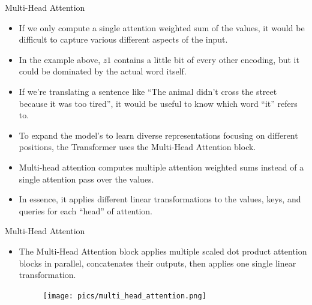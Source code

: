 \documentclass[handout]{beamer}
\begin{document}
\begin{frame}{Multi-Head Attention}
\begin{scriptsize}
\begin{itemize}

\item If we only compute a single attention weighted sum of the values, it would be difficult to capture various different aspects of the input.
\item In the example above, $z1$ contains a little bit of every other encoding, but it could be dominated by the actual word itself.
\item If we’re translating a sentence like ``The animal didn’t cross the street because it was too tired'', it would be useful to know which word ``it'' refers to.

\item To expand the model's to learn diverse representations focusing on different positions, the Transformer uses the Multi-Head Attention block.

\item Multi-head attention computes multiple attention weighted sums instead of a single attention pass over the values.

\item In essence, it applies different linear transformations to the values, keys, and queries for each ``head'' of attention.

 
\end{itemize}

\end{scriptsize}

\end{frame}



\begin{frame}{Multi-Head Attention}
\begin{scriptsize}
\begin{itemize}
 \item The Multi-Head Attention block applies multiple scaled dot product attention blocks in parallel, concatenates their outputs, then applies one single linear transformation.
 
 
     \begin{figure}[h]
        	\texttt{[image: pics/multi\_head\_attention.png]}
        \end{figure}  
 

\end{itemize}

\end{scriptsize}

\end{frame}
\end{document}

